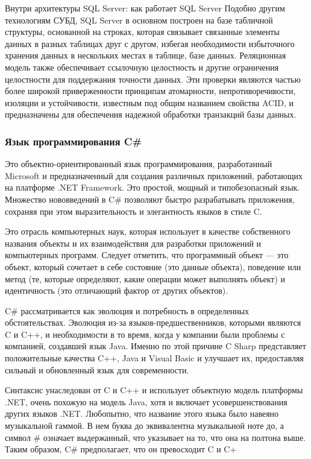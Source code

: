 Внутри архитектуры SQL Server: как работает SQL Server Подобно другим технологиям СУБД, SQL Server в основном построен на базе табличной структуры, основанной на строках, которая связывает связанные элементы данных в разных таблицах друг с другом, избегая необходимости избыточного хранения данных в нескольких местах в таблице, базе данных. Реляционная модель также обеспечивает ссылочную целостность и другие ограничения целостности для поддержания точности данных. Эти проверки являются частью более широкой приверженности принципам атомарности, непротиворечивости, изоляции и устойчивости, известным под общим названием свойства ACID, и предназначены для обеспечения надежной обработки транзакций базы данных.

\subsubsection{Язык программирования C\#}

Это объектно-ориентированный язык программирования, разработанный Microsoft и предназначенный для создания различных приложений, работающих на платформе .NET Framework. Это простой, мощный и типобезопасный язык. Множество нововведений в C\# позволяют быстро разрабатывать приложения, сохраняя при этом выразительность и элегантность языков в стиле C.

Это отрасль компьютерных наук, которая использует в качестве собственного названия объекты и их взаимодействия для разработки приложений и компьютерных программ. Следует отметить, что программный объект — это объект, который сочетает в себе состояние (это данные объекта), поведение или метод (те, которые определяют, какие операции может выполнять объект) и идентичность (это отличающий фактор от других объектов).

C\# рассматривается как эволюция и потребность в определенных обстоятельствах. Эволюция из-за языков-предшественников, которыми являются C и C++, и необходимости в то время, когда у компании были проблемы с компанией, создавшей язык Java. Именно по этой причине C Sharp представляет положительные качества C++, Java и Visual Basic и улучшает их, предоставляя сильный и обновленный язык для современности.

Синтаксис унаследован от C и C++ и использует объектную модель платформы .NET, очень похожую на модель Java, хотя и включает усовершенствования других языков .NET. Любопытно, что название этого языка было навеяно музыкальной гаммой. В нем буква до эквивалентна музыкальной ноте до, а символ \# означает выдержанный, что указывает на то, что она на полтона выше. Таким образом, C\# предполагает, что он превосходит C и C+

